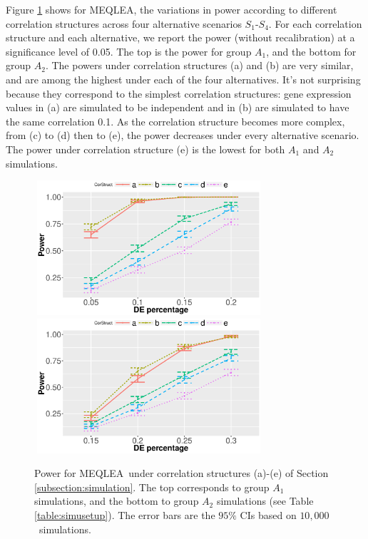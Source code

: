 \documentclass[a4,center,fleqn]{NAR}
\newcommand{\OurMethod}{MEQLEA}
\newcommand{\aaCase}{a}
\newcommand{\aCase}{c}
\newcommand{\cCase}{b}
\newcommand{\eCase}{d}
\newcommand{\fCase}{e}
\newcommand{\HowmanySimu}{$10,000$}
\begin{document}
	Figure \ref{fig:power} shows for \OurMethod, the variations in power according to different
	correlation structures across four alternative scenarios $S_1$-$S_4$. For each correlation structure
	and each alternative, we report the power (without recalibration) at a significance level of 0.05.
	The top is the power for group $A_1$, and the bottom for group $A_2$.  The powers under correlation structures (\aaCase)
	and (\cCase) are very similar, and are among the highest under each of the four alternatives. It's
	not surprising because they correspond to the simplest correlation structures: gene expression
	values in (\aaCase) are simulated to be independent and in (\cCase) are simulated to have the same
	correlation 0.1. As the correlation structure becomes more complex, from (\aCase) to (\eCase) then
	to (\fCase), the power decreases under every alternative scenario. The power under correlation
	structure (\fCase) is the lowest for both $A_1$ and $A_2$ simulations.%
	
	\begin{figure}
		\begin{center}
			\includegraphics[width=8.5cm,height=5cm]{Figures/powerA1pct.eps}
			\includegraphics[width=8.5cm,height=5cm]{Figures/powerA2pct.eps}
		\end{center} 
		\caption{Power for \OurMethod~under correlation structures (\aaCase)-(\fCase) of Section
			\ref{subsection:simulation}. The top corresponds to group $A_1$ simulations, and the bottom to group
			$A_2$ simulations (see Table \ref{table:simusetup}). The error bars are the $95\%$ CIs based on
			\HowmanySimu~simulations. }\label{fig:power}
	\end{figure} 
	
\end{document}
